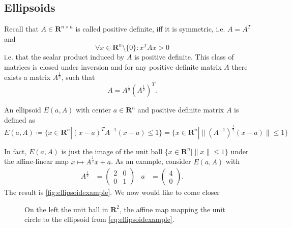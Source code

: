 \documentclass[10pt]{article}
\newcommand{\R}{\mathbf{R}}
\newcommand{\transpose}{T}
\begin{document}
\subsection{Ellipsoids}
Recall that $A \in \R^{n \times n}$ is called positive definite, iff it is symmetric, i.e. $A = A^\transpose$ and 
\[
\forall x \in \R^n\setminus \{0\} \colon x^\transpose A x > 0
\]
i.e. that the scalar product induced by $A$ is positive definite. This class of matrices is closed under inversion and for any positive definite matrix $A$ there exists a matrix $A^{\frac{1}{2}}$, such that
\[
A = A^{\frac{1}{2}} (A^{\frac{1}{2}})^\transpose.
\]
\begin{definition}[Ellipsoid]
An ellipsoid $E(a,A)$ with center $a \in \R^n$ and positive definite matrix $A$ is defined as
\[
E(a,A) \coloneqq \{x \in \R^n | (x-a)^{\transpose} A^{-1} (x-a) \le 1 \} = \{x \in \R^n | \| (A^{-1})^\frac{1}{2} (x-a) \| \le 1 \}
\]
\end{definition}
In fact, $E(a,A)$ is just the image of the unit ball $\{x\in \R^n | \|x\|\le 1\}$ under the affine-linear map $x \mapsto A^{\frac{1}{2}} x + a$. As an example, consider $E(a,A)$ with 
\begin{align}
A^{\frac{1}{2}} &= \begin{pmatrix} 2 & 0 \\ 0 & 1 \end{pmatrix} & a &= \begin{pmatrix} 4 \\ 0 \end{pmatrix}. \label{eq:ellipsoidexample}
\end{align}
The result is \autoref{fig:ellipsoidexample}. We now would like to come closer 
\begin{figure}
\centering
{}
\caption{On the left the unit ball in $\R^2$, the affine map mapping the unit circle to the ellipsoid from \protect\autoref{eq:ellipsoidexample}.}
\label{fig:ellipsoidexample}
\end{figure}
\end{document}

